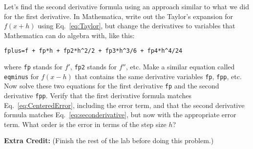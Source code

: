 \begin{enumerate}
\prob \label{P:1.fppDeriv}

\begin{enumerate}
\subprob Let's find the second derivative formula using an
    approach similar to what we did for the first derivative.
    In Mathematica, write out the Taylor's expansion for
    $f(x+h)$ using Eq.~\eqref{eq:Taylor}, but change the
    derivatives to variables that Mathematica can do algebra
    with, like this:
\begin{Verbatim}
fplus=f + fp*h + fp2*h^2/2 + fp3*h^3/6 + fp4*h^4/24
\end{Verbatim}
    where {\tt fp} stands for $f'$, {\tt fp2} stands for
    $f''$, etc. Make a similar equation called {\tt eqminus}
    for $f(x-h)$ that contains the same derivative variables
    {\tt fp}, {\tt fpp}, etc. Now solve these two equations
    for the first derivative {\tt fp} and the second
    derivative {\tt fpp}. Verify that the first derivative
    formula matches Eq.~\eqref{eq:CenteredError}, including
    the error term, and that the second derivative formula
    matches Eq.~\eqref{eq:seconderivative}, but now with the
    appropriate error term. What order is the error in terms
    of the step size $h$?

%

\subprob \label{P:1.5b} \textbf{Extra Credit:} (Finish the
    rest of the lab before doing this problem.)


\end{enumerate}
\end{enumerate}
